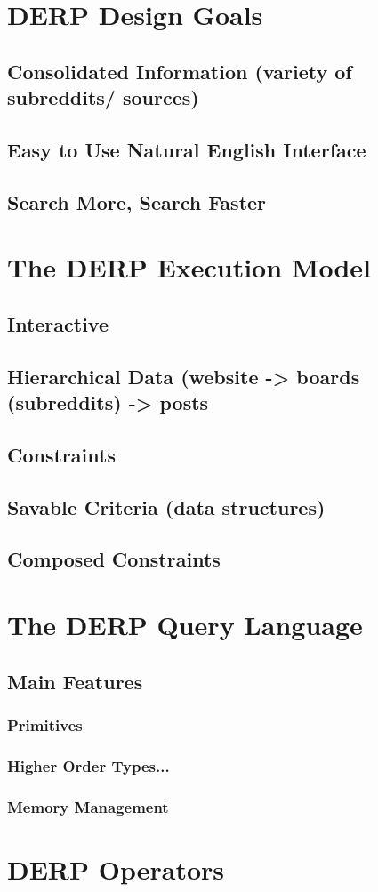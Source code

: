 \documentclass{article}
\begin{document}
\section{DERP Design Goals}
\subsection{Consolidated Information (variety of subreddits/ sources)}
\subsection{Easy to Use Natural English Interface}
\subsection{Search More, Search Faster}

\section{The DERP Execution Model}
\subsection{Interactive}
\subsection{Hierarchical Data (website -> boards (subreddits) -> posts}
\subsection{Constraints}
\subsection{Savable Criteria (data structures)}
\subsection{Composed Constraints}

\section{The DERP Query Language}
\subsection{Main Features}
\subsubsection{Primitives}
\subsubsection{Higher Order Types...}
\subsubsection{Memory Management}
\section{DERP Operators}
\end{document}
